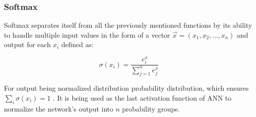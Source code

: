 \subsubsection{Softmax}

Softmax separates itself from all the previously mentioned functions by its ability to handle multiple input values in the form of a vector $\vec{x} = (x_1,x_2,...,x_n)$ and output for each $x_i$ defined as:

\begin{equation}
    {\sigma(x_i) = \frac{e^x_i}{\sum_{j=1}^{n}e^x_j}}
\end{equation}


For output being normalized distribution probability distribution, which ensures $\sum_{i}\sigma(x_i) = 1$ \cite{lipton2015critical}. It is being used as the last activation function of ANN to normalize the network's output into $n$ probability groups.
